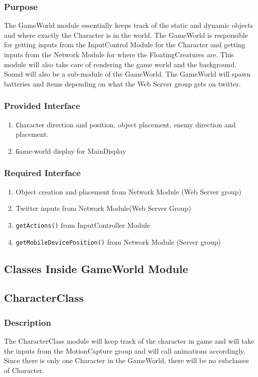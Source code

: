 \documentclass[10pt,letterpaper,oneside,english]{article}
\newcommand{\code}[1]{\texttt{#1}}
\newcommand{\citem}[1]{\item \code{#1}}
\begin{document}
\subsubsection{Purpose}
	The GameWorld module essentially keeps track of the static and dynamic objects and where exactly the Character is in the world. The GameWorld is responsible for getting inputs from the InputControl Module for the Character and getting inputs from the Network Module for where the FloatingCreatures are. This module will also take care of rendering the game world and the background. Sound will also be a sub-module of the GameWorld. The GameWorld will spawn batteries and items depending on what the Web Server group gets on twitter. 

\subsubsection{Provided Interface}
\begin{enumerate}
	\citem Character direction and position, object placement, enemy direction and placement. 
	\citem Game-world display for MainDisplay
\end{enumerate}
\subsubsection{Required Interface}
\begin{enumerate}
	\item Object creation and placement from Network Module (Web Server group)
	\item Twitter inputs from Network Module(Web Server Group)
	\item \code{getActions()} from InputController Module
	\item \code{getMobileDevicePosition()} from Network Module (Server group)
\end{enumerate}

\subsection{Classes Inside GameWorld Module}

\subsection{CharacterClass}

\subsubsection{Description}
	The CharacterClass module will keep track of the character in game and will take the inputs from the MotionCapture group and will call animations accordingly. Since there is only one Character in the GameWorld, there will be no subclasses of Character. 
\end{document}

